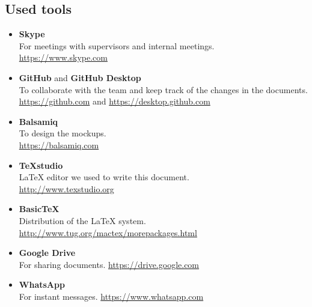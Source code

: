 \subsection{Used tools}
\begin{itemize}
	\item \textbf{Skype} \\
	For meetings with supervisors and internal meetings.\\
	\url{https://www.skype.com}
	\item \textbf{GitHub} and \textbf{GitHub Desktop} \\
	To collaborate with the team and keep track of the changes in the documents. \\
	\url{https://github.com} and \url{https://desktop.github.com}
	\item \textbf{Balsamiq} \\
	To design the mockups. \\
	\url{https://balsamiq.com}
	\item \textbf{TeXstudio} \\
	LaTeX editor we used to write this document. \\
	\url{http://www.texstudio.org}
	\item \textbf{BasicTeX} \\
	Distribution of the LaTeX system. \\
	\url{http://www.tug.org/mactex/morepackages.html}
	\item \textbf{Google Drive} \\
	For sharing documents.
	\url{https://drive.google.com}
	\item \textbf{WhatsApp} \\
	For instant messages.
	\url{https://www.whatsapp.com}
\end{itemize}